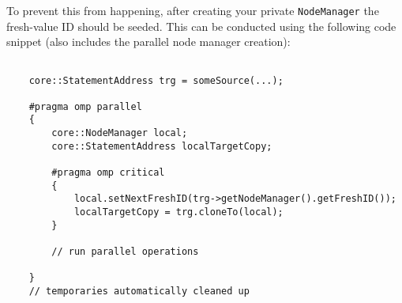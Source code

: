 To prevent this from happening, after creating your private \texttt{NodeManager} the
fresh-value ID should be seeded. This can be conducted using the following code
snippet (also includes the parallel node manager creation):
\begin{lstlisting}

	core::StatementAddress trg = someSource(...);
	
	#pragma omp parallel
	{
		core::NodeManager local;
		core::StatementAddress localTargetCopy;

		#pragma omp critical
		{
			local.setNextFreshID(trg->getNodeManager().getFreshID());
			localTargetCopy = trg.cloneTo(local);
		}
	
		// run parallel operations

	}
	// temporaries automatically cleaned up
\end{lstlisting}


